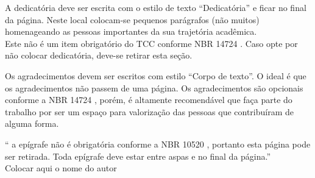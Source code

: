 \documentclass[
        oneside,      %
        english,			
        brazil			 
        ]{configcefetmglpd}
\begin{document}


\printacapa

\printafolhaderosto

\printacatalog  


\printafolhaaprov


 \begin{dedicatoria}
  		A dedicatória deve ser escrita com o estilo de texto “Dedicatória” e ficar no final da página. Neste local colocam-se pequenos parágrafos (não muitos) homenageando as pessoas importantes da sua trajetória acadêmica.\\  		
  		Este não é um item obrigatório do TCC conforme NBR 14724 \cite{bib:abnt14724}. Caso opte por não colocar dedicatória, deve-se retirar esta seção.
 \end{dedicatoria}

 
\begin{agradecimentos}
Os agradecimentos devem ser escritos com estilo “Corpo de texto”. O ideal é que os agradecimentos não passem de uma página. Os agradecimentos são opcionais conforme a NBR 14724 \cite{bib:abnt14724}, porém, é altamente recomendável que faça parte do trabalho por ser um espaço para valorização das pessoas que contribuíram de alguma forma.
\end{agradecimentos}


\begin{epigrafemais}
	`` a epígrafe não é obrigatória conforme a NBR 10520 \cite{bib:abnt10520}, portanto esta página pode ser retirada. Toda epígrafe deve estar entre aspas e no final da página.''\\
	\raggedleft Colocar aqui o nome do autor
\end{epigrafemais}


\end{document}
